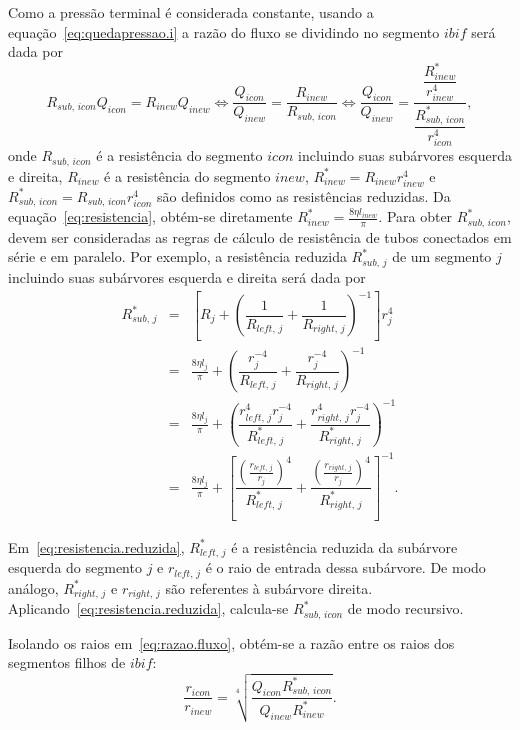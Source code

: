Como a pressão terminal é considerada constante, usando a equação~\eqref{eq:quedapressao.i} 
a razão do fluxo se dividindo no segmento $ibif$ será dada por
\begin{equation}
  R_{sub,\,icon}Q_{icon} = R_{inew}Q_{inew} \iff \frac{Q_{icon}}{Q_{inew}} = \frac{R_{inew}}{R_{sub,\,icon}}
  \iff \frac{Q_{icon}}{Q_{inew}} = \frac{\dfrac{R^*_{inew}}{r^4_{inew}}}{\dfrac{R^*_{sub,\,icon}}{r^4_{icon}}},
  \label{eq:razao.fluxo}
\end{equation}
onde $R_{sub,\,icon}$ é a resistência do segmento $icon$ incluindo suas subárvores 
esquerda e direita, $R_{inew}$ é a resistência do segmento $inew$, $R^*_{inew} = R_{inew}r^4_{inew}$
e $R^*_{sub,\,icon} = R_{sub,\,icon}r^4_{icon}$ são definidos como as resistências
reduzidas. Da equação~\eqref{eq:resistencia}, obtém-se diretamente 
$R^*_{inew} = \frac{8\eta l_{inew}}{\pi}$. Para obter $R^*_{sub,\,icon}$, devem ser 
consideradas as regras de cálculo de resistência de tubos conectados em série e em 
paralelo. Por exemplo, a resistência reduzida $R^*_{sub,\,j}$ de um segmento $j$ 
incluindo suas subárvores esquerda e direita será dada por
\begin{eqnarray}
  R^*_{sub,\,j} &=& \left[R_{j} + \left(\dfrac{1}{R_{left,\,j}} + \dfrac{1}{R_{right,\,j}}\right)^{-1}\right]r^4_j \nonumber\\ 
  &=& \frac{8\eta l_{j}}{\pi} + \left(\dfrac{r^{-4}_j}{R_{left,\,j}} + \dfrac{r^{-4}_j}{R_{right,\,j}}\right)^{-1} \nonumber\\
  &=& \frac{8\eta l_{j}}{\pi} + \left(\dfrac{r^4_{left,\,j}r^{-4}_j}{R^*_{left,\,j}} + \dfrac{r^4_{right,\,j}r^{-4}_j}{R^*_{right,\,j}}\right)^{-1} \nonumber\\
  &=& \frac{8\eta l_{j}}{\pi} + \left[\dfrac{\left(\frac{r_{left,\,j}}{r_j}\right)^4}{R^*_{left,\,j}} + \dfrac{\left(\frac{r_{right,\,j}}{r_j}\right)^4}{R^*_{right,\,j}}\right]^{-1}.
  \label{eq:resistencia.reduzida}
\end{eqnarray}

Em~\eqref{eq:resistencia.reduzida}, $R^*_{left,\,j}$ é a resistência reduzida da 
subárvore esquerda do segmento $j$ e $r_{left,\,j}$ é o raio de entrada dessa subárvore. 
De modo análogo, $R^*_{right,\,j}$ e $r_{right,\,j}$ são referentes à subárvore direita. 
Aplicando~\eqref{eq:resistencia.reduzida}, calcula-se $R^*_{sub,\,icon}$ de modo recursivo.

Isolando os raios em~\eqref{eq:razao.fluxo}, obtém-se a razão entre os raios dos 
segmentos filhos de $ibif$:
\begin{equation}
  \dfrac{r_{icon}}{r_{inew}} = \sqrt[4]{\frac{Q_{icon}R^*_{sub,\,icon}}{Q_{inew}R^*_{inew}}}.
  \label{eq:razao.raios}
\end{equation}


